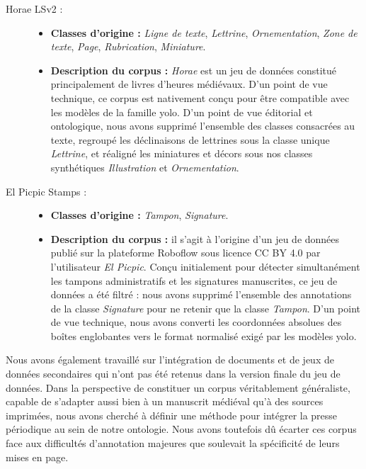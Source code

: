 \begin{description}

\item[Horae LSv2 :] \hfill
\begin{itemize}
	\item \textbf{Classes d'origine :} \textit{Ligne de texte}, \textit{Lettrine}, \textit{Ornementation}, \textit{Zone de texte}, \textit{Page}, \textit{Rubrication}, \textit{Miniature}.
	\item \textbf{Description du corpus :} \textit{Horae} est un jeu de données constitué principalement de livres d'heures médiévaux. D'un point de vue technique, ce corpus est nativement conçu pour être compatible avec les modèles de la famille \gls{yolo}. D'un point de vue éditorial et ontologique, nous avons supprimé l'ensemble des classes consacrées au texte, regroupé les déclinaisons de lettrines sous la classe unique \textit{Lettrine}, et réaligné les miniatures et décors sous nos classes synthétiques \textit{Illustration} et \textit{Ornementation}.
\end{itemize}


\item[El Picpic Stamps :] \hfill
\begin{itemize}
	\item \textbf{Classes d'origine :} \textit{Tampon}, \textit{Signature}.
	\item \textbf{Description du corpus :} il s'agit à l'origine d'un jeu de données publié sur la plateforme Roboflow sous licence CC BY 4.0 par l'utilisateur \textit{El Picpic}. Conçu initialement pour détecter simultanément les tampons administratifs et les signatures manuscrites, ce jeu de données a été filtré : nous avons supprimé l'ensemble des annotations de la classe \textit{Signature} pour ne retenir que la classe \textit{Tampon}. D'un point de vue technique, nous avons converti les coordonnées absolues des boîtes englobantes vers le format normalisé exigé par les modèles \gls{yolo}.
\end{itemize}

\end{description}

Nous avons également travaillé sur l'intégration de documents et de jeux de données secondaires qui n'ont pas été retenus dans la version finale du jeu de données. Dans la perspective de constituer un corpus véritablement généraliste, capable de s'adapter aussi bien à un manuscrit médiéval qu'à des sources imprimées, nous avons cherché à définir une méthode pour intégrer la presse périodique au sein de notre ontologie. Nous avons toutefois dû écarter ces corpus face aux difficultés d'annotation majeures que soulevait la spécificité de leurs mises en page.

